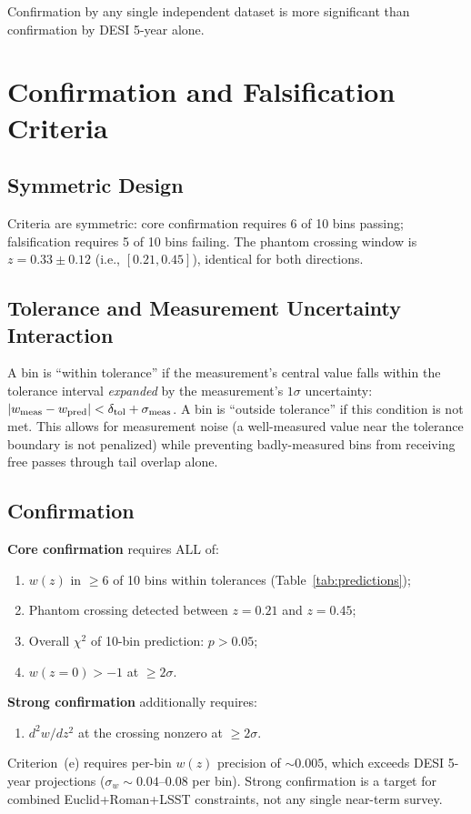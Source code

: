 \documentclass[12pt,preprint]{aastex631}
\begin{document}
Confirmation by any single independent dataset is more significant than confirmation by DESI 5-year alone.

\section{Confirmation and Falsification Criteria}

\subsection{Symmetric Design}

Criteria are symmetric: core confirmation requires 6 of 10 bins passing; falsification requires 5 of 10 bins failing. The phantom crossing window is $z = 0.33 \pm 0.12$ (i.e., $[0.21, 0.45]$), identical for both directions.

\subsection{Tolerance and Measurement Uncertainty Interaction}

A bin is ``within tolerance'' if the measurement's central value falls within the tolerance interval \emph{expanded} by the measurement's $1\sigma$ uncertainty: $|w_{\rm meas} - w_{\rm pred}| < \delta_{\rm tol} + \sigma_{\rm meas}$. A bin is ``outside tolerance'' if this condition is not met. This allows for measurement noise (a well-measured value near the tolerance boundary is not penalized) while preventing badly-measured bins from receiving free passes through tail overlap alone.

\subsection{Confirmation}

\textbf{Core confirmation} requires ALL of:
\begin{enumerate}
\item[(a)] $w(z)$ in $\geq 6$ of 10 bins within tolerances (Table~\ref{tab:predictions});
\item[(b)] Phantom crossing detected between $z = 0.21$ and $z = 0.45$;
\item[(c)] Overall $\chi^2$ of 10-bin prediction: $p > 0.05$;
\item[(d)] $w(z = 0) > -1$ at $\geq 2\sigma$.
\end{enumerate}

\textbf{Strong confirmation} additionally requires:
\begin{enumerate}
\item[(e)] $d^2 w / dz^2$ at the crossing nonzero at $\geq 2\sigma$.
\end{enumerate}
Criterion~(e) requires per-bin $w(z)$ precision of $\sim 0.005$, which exceeds DESI 5-year projections ($\sigma_w \sim 0.04$--$0.08$ per bin). Strong confirmation is a target for combined Euclid+Roman+LSST constraints, not any single near-term survey.
\end{document}
